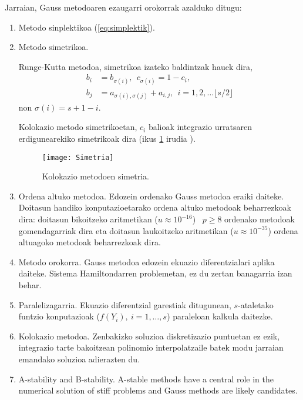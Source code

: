 Jarraian, Gauss metodoaren ezaugarri orokorrak azalduko ditugu:  
\begin{enumerate}
\item{Metodo sinplektikoa (\ref{eq:simplektik})}. 
 
\item{Metodo simetrikoa.}

Runge-Kutta metodoa, simetrikoa izateko baldintzak hauek dira,
\begin{align*}
\label {eq:2}
 b_{i} &= b_{\sigma(i)} ,\ \  c_{\sigma(i)}= 1-c_{i}, \\
 b_{j} &= a_{\sigma(i),\sigma(j)}+a_{i,j}, \ \  i=1,2,\dots \lfloor s/2\rfloor
 \end{align*} 
non $\sigma(i)=s+1-i$.

Kolokazio metodo simetrikoetan, $c_i$ balioak integrazio urratsaren erdigunearekiko simetrikoak dira (ikus \ref{fig:simetrikoa} irudia  ).  
 \begin{figure}[h]
 \centering
 \texttt{[image: Simetria]}
 \caption{ \small Kolokazio metodoen simetria.}
 \label{fig:simetrikoa}
 \end{figure}
 
\item{Ordena altuko metodoa.}
Edozein ordenako Gauss metodoa eraiki daiteke. Doitasun handiko konputazioetarako ordena altuko metodoak beharrezkoak dira: doitasun bikoitzeko aritmetikan ($u\approx10^{-16}$) ~$p\ge8$ ordenako metodoak gomendagarriak dira eta doitasun laukoitzeko aritmetikan ($u\approx10^{-35}$) ordena altuagoko metodoak beharrezkoak dira.  

\item{Metodo orokorra.}
Gauss metodoa edozein ekuazio diferentzialari aplika daiteke. Sistema Hamiltondarren problemetan, ez du zertan banagarria izan behar.

\item{Paralelizagarria.}
Ekuazio diferentzial garestiak ditugunean, $s$-ataletako funtzio konputazioak ($f(Y_i), \ i=1,\dots,s$) paraleloan kalkula daitezke.  

\item{Kolokazio metodoa.}
Zenbakizko soluzioa diskretizazio puntuetan ez ezik, integrazio tarte bakoitzean polinomio interpolatzaile batek modu jarraian emandako soluzioa adierazten du.

\item{A-stability and B-stability.}
A-stable methods have a central role in the numerical solution of stiff problems and Gauss methods are likely candidates.
  
\end{enumerate}

